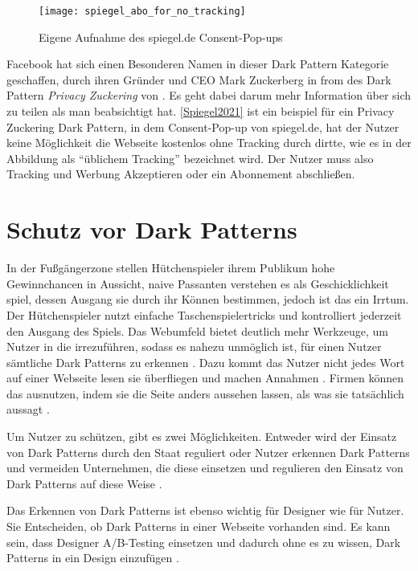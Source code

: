 \documentclass[conference,compsoc,final,a4paper]{IEEEtran}
\begin{document}
\begin{figure}[!ht]
  \centering
  \texttt{[image: spiegel\_abo\_for\_no\_tracking]}
  \caption{Eigene Aufnahme des spiegel.de Consent-Pop-ups~\autocite{Spiegel2021}}
  \label{fig:Spiegel2021}
\end{figure}

Facebook hat sich einen Besonderen Namen in dieser Dark Pattern Kategorie geschaffen, durch ihren Gründer und CEO Mark Zuckerberg in from des Dark Pattern \textit{Privacy Zuckering} von \citeauthor{Brignull} \autocite{Brignull}. Es geht dabei darum mehr Information über sich zu teilen als man beabsichtigt hat. \autoref{Spiegel2021} ist ein beispiel für ein Privacy Zuckering Dark Pattern, in dem Consent-Pop-up von spiegel.de, hat der Nutzer keine Möglichkeit die Webseite kostenlos ohne Tracking durch dirtte, wie es in der Abbildung als \enquote{üblichem Tracking} bezeichnet wird. Der Nutzer muss also Tracking und Werbung Akzeptieren oder ein Abonnement abschließen. 


\section{Schutz vor Dark Patterns}
In der Fußgängerzone stellen Hütchenspieler ihrem Publikum hohe Gewinnchancen in Aussicht, naive Passanten verstehen es als Geschicklichkeit spiel, dessen Ausgang sie durch ihr Können bestimmen, jedoch ist das ein Irrtum. Der Hütchenspieler nutzt einfache Taschenspielertricks und kontrolliert jederzeit den Ausgang des Spiels. Das Webumfeld bietet deutlich mehr Werkzeuge, um Nutzer in die irrezuführen, sodass es nahezu unmöglich ist, für einen Nutzer sämtliche Dark Patterns zu erkennen \autocite{M.Bhoot2020}. Dazu kommt das Nutzer nicht jedes Wort auf einer Webseite lesen sie überfliegen und machen Annahmen \autocite{Brignull}. Firmen können das ausnutzen, indem sie die Seite anders aussehen lassen, als was sie tatsächlich aussagt \autocite{Brignull}.

Um Nutzer zu schützen, gibt es zwei Möglichkeiten. Entweder wird der Einsatz von Dark Patterns durch den Staat reguliert oder Nutzer erkennen Dark Patterns und vermeiden Unternehmen, die diese einsetzen und regulieren den Einsatz von Dark Patterns auf diese Weise \autocite{Narayanan2020}.

Das Erkennen von Dark Patterns ist ebenso wichtig für Designer wie für Nutzer. Sie Entscheiden, ob Dark Patterns in einer Webseite vorhanden sind. Es kann sein, dass Designer A/B-Testing einsetzen und dadurch ohne es zu wissen, Dark Patterns in ein Design einzufügen \autocite{Narayanan2020}.
\end{document}
